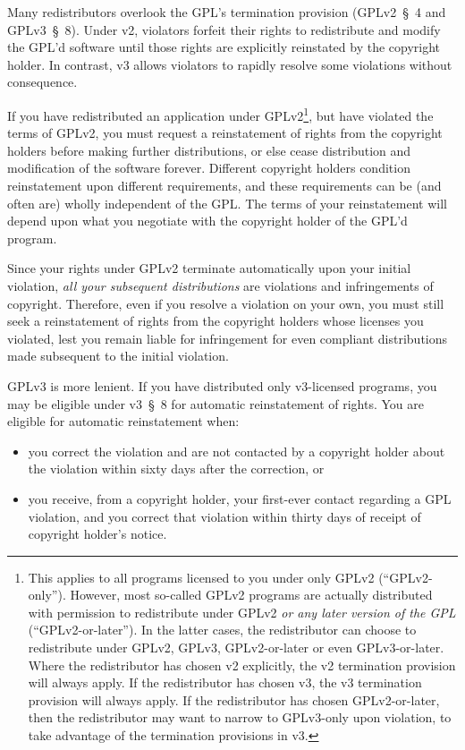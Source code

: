 Many redistributors overlook the GPL's termination provision (GPLv2~\S~4 and
GPLv3~\S~8).  Under v2, violators forfeit their rights to redistribute and
modify the GPL'd software until those rights are explicitly reinstated by
the copyright holder.  In contrast, v3 allows violators to rapidly resolve
some violations without consequence.

If you have redistributed an application under GPLv2\footnote{This applies
  to all programs licensed to you under only GPLv2 (``GPLv2-only'').
  However, most so-called GPLv2 programs are actually distributed with
  permission to redistribute under GPLv2 \emph{or any later version of the
    GPL} (``GPLv2-or-later'').  In the latter cases, the redistributor can
  choose to redistribute under GPLv2, GPLv3, GPLv2-or-later or even
  GPLv3-or-later.  Where the redistributor has chosen v2 explicitly, the
  v2 termination provision will always apply.  If the redistributor has
  chosen v3, the v3 termination provision will always apply.  If the
  redistributor has chosen GPLv2-or-later, then the redistributor may want
  to narrow to GPLv3-only upon violation, to take advantage of the
  termination provisions in v3.}, but have violated the terms of GPLv2,
you must request a reinstatement of rights from the copyright holders
before making further distributions, or else cease distribution and
modification of the software forever.  Different copyright holders
condition reinstatement upon different requirements, and these
requirements can be (and often are) wholly independent of the GPL\@.  The
terms of your reinstatement will depend upon what you negotiate with the
copyright holder of the GPL'd program.

Since your rights under GPLv2 terminate automatically upon your initial
violation, \emph{all your subsequent distributions} are violations and
infringements of copyright.  Therefore, even if you resolve a violation on
your own, you must still seek a reinstatement of rights from the copyright
holders whose licenses you violated, lest you remain liable for
infringement for even compliant distributions made subsequent to the
initial violation.

GPLv3 is more lenient.  If you have distributed only v3-licensed programs,
you may be eligible under v3~\S~8 for automatic reinstatement of rights.
You are eligible for automatic reinstatement when:
\begin{itemize}
\item you correct the violation and are not contacted by a copyright
  holder about the violation within sixty days after the correction, or

\item you receive, from a copyright holder, your first-ever contact
  regarding a GPL violation, and you correct that violation within thirty
  days of receipt of copyright holder's notice.
\end{itemize}

